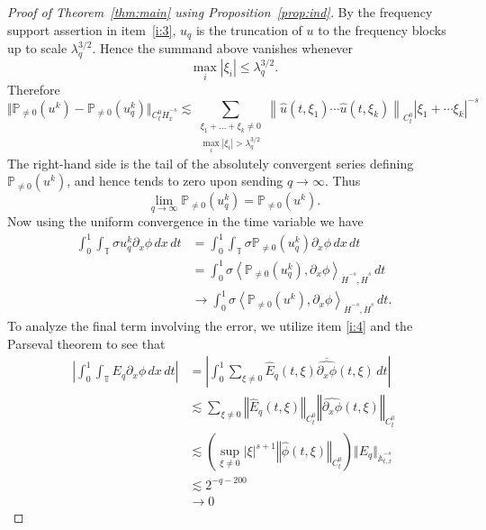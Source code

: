 \documentclass[12pt,reqno,letterpaper]{amsart}
\numberwithin{equation}{section}
\newcommand{\1}{{\bf 1}}
\newcommand{\2}{{\bf 2}}
\newcommand{\T}{\mathbb T}
\theoremstyle{remark}
\theoremstyle{remark}
\begin{document}
\begin{proof}[Proof of Theorem~\ref{thm:main} using Proposition~\ref{prop:ind}]
By the frequency support assertion in item~\ref{i:3}, $u_q$ is the truncation of $u$ to the frequency blocks up to scale $\lambda_q^{3/2}$. Hence the summand above vanishes whenever
\[
\max_i |\xi_i|\le \lambda_q^{3/2}.
\]
Therefore
$$
   \Vert \mathbb{P}_{\not=0}(u^k) - \mathbb{P}_{\not=0}(u_q^k) \Vert_{C_t^0 \dot{H}_x^{-s}} \lesssim \sum_{\substack{\xi_1+\ldots+\xi_k \not=0\\\max_i|\xi_i|>\lambda_q^{3/2}}} \left\|\hat u(t,\xi_1) \cdots \hat u(t,\xi_k)\right\|_{C_t^0}|\xi_1 +\cdots \xi_k|^{-s}
$$
The right-hand side is the tail of the absolutely convergent series defining $\mathbb P_{\neq0}(u^k)$, and hence tends to zero upon sending $q \to \infty$. Thus
$$
\lim_{q \to \infty} \mathbb{P}_{\not=0}(u_q^k) = \mathbb{P}_{\not=0}(u^k).
$$
Now using the uniform convergence in the time variable we have
\begin{equation}\label{eq:nonlin_term_conv}
    \begin{split}
        \int_0^1 \int_{\T} \sigma u_q^k \partial_{x}\phi\, dx\, dt &= \int_0^1 \int_{\T} \sigma \mathbb{P}_{\not=0}\left(u_q^k\right) \partial_{x}\phi\, dx\, dt\\
        &= \int_0^1 \sigma \left\langle \mathbb{P}_{\not=0}\left(u_q^k\right), \partial_{x}\phi\right\rangle_{\dot{H}^{-s},\dot{H}^s}\, dt\\
        &\to \int_0^1 \sigma \left\langle \mathbb{P}_{\not=0}\left(u^k\right), \partial_{x}\phi\right\rangle_{\dot{H}^{-s},\dot{H}^s}\, dt.
    \end{split}
\end{equation}
To analyze the final term involving the error, we utilize item \ref{i:4} and the Parseval theorem to see that
\begin{equation}\label{eq:error_term_conv}
\begin{split}
    \left|\int_0^1 \int_{\T} E_q \partial_x\phi\, dx\, dt\right| &= \left| \int_0^1 \sum_{\xi \not =0} \hat{E}_q(t,\xi) \overline{\widehat{\partial_x\phi}}(t,\xi)\, dt\right|\\
    &\lesssim \sum_{\xi\not=0} \left\Vert \hat{E}_q(t,\xi) \right\Vert_{C_t^0} \left\Vert \widehat{\partial_x\phi}(t,\xi)\right\Vert_{C_t^0}\\
    &\lesssim \left(\sup_{\xi \not=0} |\xi|^{s+1} \left\Vert \hat{\phi}(t,\xi)\right\Vert_{C_t^0}\right) \Vert E_q \Vert_{\dot{\mathbb{A}}^{-s}_{t,x}}\\
    &\lesssim 2^{-q-200}\\
    &\to 0
    \end{split}
\end{equation}

\end{proof}
\end{document}
